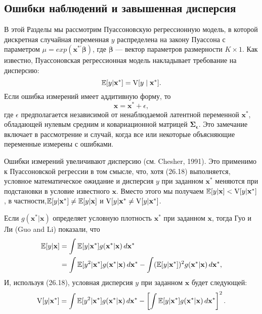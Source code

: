 \subsection*{Ошибки наблюдений и завышенная дисперсия} 
В этой Разделы мы рассмотрим Пуассоновскую регрессионную модель, в которой дискретная случайная переменная $y$ распределена на закону Пуассона с параметром $\mu = exp(\mathbf{x^{*\prime} \beta})$, где $\mathbf{\beta}$ --- вектор параметров размерности $K \times 1$. Как известно, Пуассоновская регрессионная модель накладывает требование на дисперсию:
\begin{equation}
\mathbb{E}[y| \mathbf{x^*}]=\mathrm{V}[y \mid  \mathbf{x^*}].
\end{equation} 
Если ошибка измерений имеет аддитивную форму, то
\[
\mathbf{x}=\mathbf{x^*}+ \epsilon,
\]
где $\epsilon$ предполагается независимой от ненаблюдаемой латентной переменной $\mathbf{x^*}$, обладающей нулевым средним и ковариационной матрицей $\mathbf{\Sigma_{\epsilon}}$. Это замечание включает в рассмотрение и случай, когда все или некоторые объясняющие переменные измерены с ошибками.

Ошибки измерений увеличивают дисперсию (см. Chesher, 1991). Это применимо к Пуассоновской регрессии в том смысле, что, хотя (26.18) выполняется, условное математическое ожидание и дисперсия $y$ при заданном $\mathbf{x^*}$ меняются при подстановки в условие известного $\mathbf{x}$. Вместо этого мы получаем $\mathbb{E}[y| \mathbf{x}]<\mathrm{V}[y| \mathbf{x^*}]$, в частности,$\mathbb{E}[y| \mathbf{x^*}] \neq \mathbb{E}[y| \mathbf{x}]$  и $\mathrm{V}[y| \mathbf{x^*} \neq \mathrm{V}[y| \mathbf{x^*}]$.

Если $g(\mathbf{x^*|x})$ определяет условную плотность $\mathbf{x^*}$ при заданном $\mathbf{x}$, тогда Гуо и Ли (Guo and Li) показали, что
\begin{align}
\mathbb{E}[y| \mathbf{x}] &= \int \mathbb{E}[y| \mathbf{x^*}]g(\mathbf{x^*|x})\, d\mathbf{x^*} \notag \\
&= \int \mathbb{E}[y^2| \mathbf{x^*}]g(\mathbf{x^*|x})\, d\mathbf{x^*} - \int (\mathbb{E}[y| \mathbf{x^*}])^2 g(\mathbf{x^*|x})\, d\mathbf{x^*},
\end{align}
И, используя (26.18), условная дисперсия $y$ при заданном $\mathbf{x}$ будет следующей:
\begin{equation}
\mathrm{V}[y| \mathbf{x^*}]= \int \mathbb{E}[y^2| \mathbf{x^*}]g(\mathbf{x^*|x})\, d\mathbf{x^*} -  \left[ \int \mathbb{E}[y| \mathbf{x^*}]g(\mathbf{x^*|x})\, d\mathbf{x^*} \right]^2.
\end{equation}

